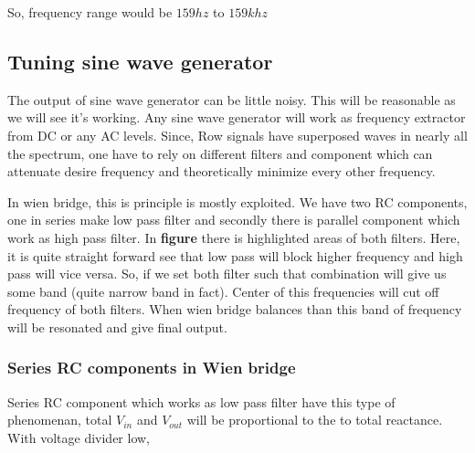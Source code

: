 \documentclass[14pt,a4paper]{extarticle}
\begin{document}
So, frequency range would be \(159 hz\) to \(159k hz\)

\subsection{Tuning sine wave generator}
\label{sec:orgce6a5fa}

The output of sine wave generator can be little noisy. This will be reasonable as we will see it's working. Any sine wave generator will work as frequency extractor from DC or any AC levels. Since, Row signals have superposed waves in nearly all the spectrum, one have to rely on different filters and component which can attenuate desire frequency and theoretically minimize every other frequency. 


In wien bridge, this is principle is mostly exploited. We have two RC components, one in series make low pass filter and secondly there is parallel component which work as high pass filter. In \textbf{\textbf{figure}} there is highlighted areas of both filters. Here, it is quite straight forward see that low pass will block higher frequency and high pass will vice versa. So, if we set both filter such that combination will give us some band (quite narrow band in fact). Center of this frequencies will cut off frequency of both filters. When wien bridge balances than this band of frequency will be resonated and give final output.

\subsubsection{Series RC components in Wien bridge}
\label{sec:orgb455f63}
Series RC component which works as low pass filter have this type of phenomenan, total \(V_{in}\) and \(V_{out}\) will be proportional to the to total reactance. With voltage divider low, 
\end{document}
